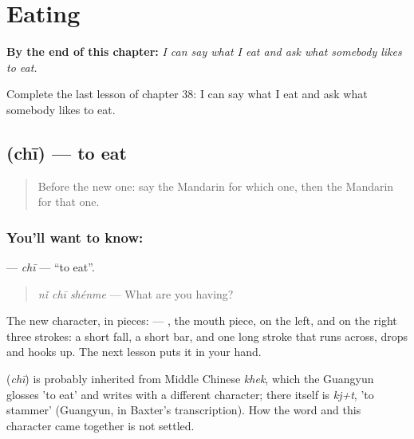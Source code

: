 
\chapter{Eating}
\label{ch:zh-eating}

\begin{chapteropening}
\textbf{By the end of this chapter:} \emph{I can say what I eat and ask what somebody likes to eat.}

Complete the last lesson of chapter 38: I can say what I eat and ask what somebody likes to eat.
\end{chapteropening}

\section[\texorpdfstring{\zh{吃} (chī)}{吃 (chī)}]{ (chī) — to eat}

\label{lesson:ZH-C38-chi}



\begin{quote}
Before the new one: say the Mandarin for which one, then the Mandarin for that one.
\end{quote}

\subsection*{You'll want to know: }
\textbf{} — \emph{chī} — \textquotedblleft{}to eat\textquotedblright{}.

\begin{quote}
\textbf{} \emph{nǐ chī shénme} — What are you having?
\end{quote}

The new character, in pieces:  — , the mouth piece, on the left, and on the right three strokes: a short fall, a short bar, and one long stroke that runs across, drops and hooks up. The next lesson puts it in your hand.

\begin{cousinweb}
\textbf{} (\emph{chī}) is probably inherited from Middle Chinese \emph{khek}, which the Guangyun glosses 'to eat' and writes with a different character; there  itself is \emph{kj+t}, 'to stammer' (Guangyun, in Baxter's transcription). How the word and this character came together is not settled.
\end{cousinweb}


